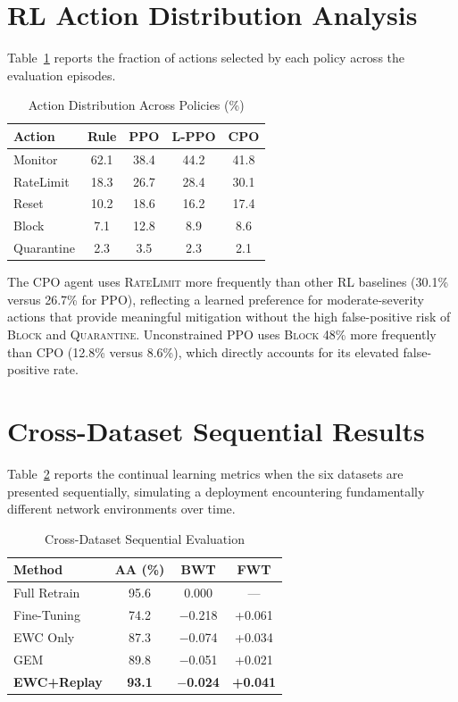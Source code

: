 \documentclass[journal]{IEEEtran}
\begin{document}
\section{RL Action Distribution Analysis}

Table~\ref{tab:action_dist} reports the fraction of actions selected by each policy across the evaluation episodes.

\begin{table}[!t]
\centering
\caption{Action Distribution Across Policies (\%)}
\label{tab:action_dist}
\begin{tabular}{@{}lcccc@{}}
\toprule
\textbf{Action} & \textbf{Rule} & \textbf{PPO} & \textbf{L-PPO} & \textbf{CPO} \\
\midrule
Monitor & 62.1 & 38.4 & 44.2 & 41.8 \\
RateLimit & 18.3 & 26.7 & 28.4 & 30.1 \\
Reset & 10.2 & 18.6 & 16.2 & 17.4 \\
Block & 7.1 & 12.8 & 8.9 & 8.6 \\
Quarantine & 2.3 & 3.5 & 2.3 & 2.1 \\
\bottomrule
\end{tabular}
\end{table}

The CPO agent uses \textsc{RateLimit} more frequently than other RL baselines (30.1\% versus 26.7\% for PPO), reflecting a learned preference for moderate-severity actions that provide meaningful mitigation without the high false-positive risk of \textsc{Block} and \textsc{Quarantine}. Unconstrained PPO uses \textsc{Block} 48\% more frequently than CPO (12.8\% versus 8.6\%), which directly accounts for its elevated false-positive rate.

\section{Cross-Dataset Sequential Results}

Table~\ref{tab:crossdataset} reports the continual learning metrics when the six datasets are presented sequentially, simulating a deployment encountering fundamentally different network environments over time.

\begin{table}[!t]
\centering
\caption{Cross-Dataset Sequential Evaluation}
\label{tab:crossdataset}
\begin{tabular}{@{}lccc@{}}
\toprule
\textbf{Method} & \textbf{AA (\%)} & \textbf{BWT} & \textbf{FWT} \\
\midrule
Full Retrain & 95.6 & 0.000 & --- \\
Fine-Tuning & 74.2 & $-$0.218 & +0.061 \\
EWC Only & 87.3 & $-$0.074 & +0.034 \\
GEM & 89.8 & $-$0.051 & +0.021 \\
\textbf{EWC+Replay} & \textbf{93.1} & \textbf{$-$0.024} & \textbf{+0.041} \\
\bottomrule
\end{tabular}
\end{table}
\end{document}
